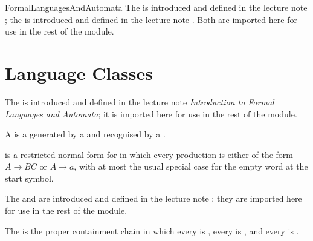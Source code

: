 \documentclass[hidelinks]{article}
\begin{document}
\begin{smodule}[title={Formal Languages and Automata}]{FormalLanguagesAndAutomata}
    The  is introduced and defined in the lecture note ; the  is introduced and defined in the lecture note . Both are imported here for use in the rest of the module.

    \section{Language Classes}

    The  is introduced and defined in the lecture note \emph{Introduction to Formal Languages and Automata}; it is imported here for use in the rest of the module.

    \begin{sdefinition}[for=context-free language]
        A  is a  generated by a  and recognised by a .
    \end{sdefinition}

    \begin{sdefinition}[for=Chomsky normal form]
         is a restricted normal form for  in which every production is either of the form $A \to BC$ or $A \to a$, with at most the usual special case for the empty word at the start symbol.
    \end{sdefinition}

    The  and  are introduced and defined in the lecture note ; they are imported here for use in the rest of the module.

    \begin{sdefinition}[for=Chomsky hierarchy]
        The  is the proper containment chain in which every  is , every  is , and every  is .
    \end{sdefinition}


\end{smodule}
\end{document}
